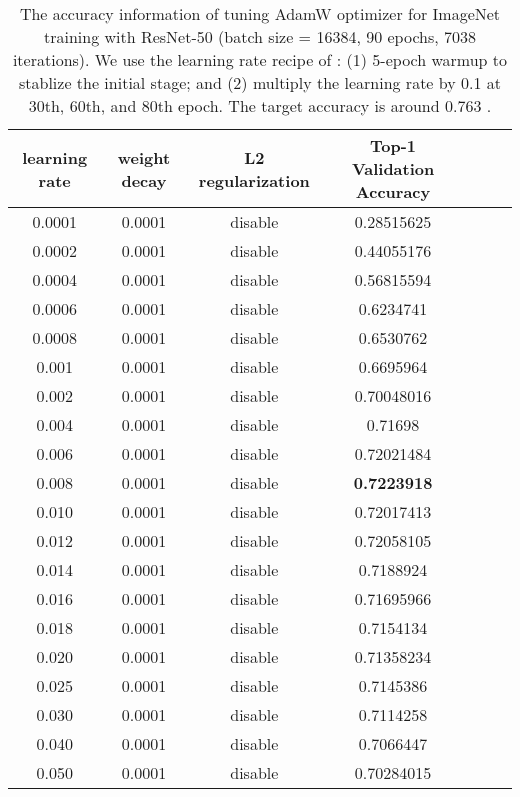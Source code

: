 \documentclass{article} \usepackage{iclr2020_conference,times}
\begin{document}
\begin{table}[ht]
\renewcommand{\arraystretch}{1.3}
\caption{The accuracy information of tuning AdamW optimizer for ImageNet training with ResNet-50 (batch size = 16384, 90 epochs, 7038 iterations). We use the learning rate recipe of \citep{goyal2017accurate}: (1) 5-epoch warmup to stablize the initial stage; and (2) multiply the learning rate by 0.1 at 30th, 60th, and 80th epoch. The target accuracy is around 0.763 \citep{goyal2017accurate}.}
\centering
\begin{tabular}{|c|c|c|c|c|c|c|}
\hline
learning rate & weight decay & L2 regularization & Top-1 Validation Accuracy \\
\hline
\hline
0.0001 & 0.0001 & disable & 0.28515625 \\
\hline
0.0002 & 0.0001 & disable & 0.44055176 \\
\hline
0.0004 & 0.0001 & disable & 0.56815594 \\
\hline
0.0006 & 0.0001 & disable & 0.6234741 \\
\hline
0.0008 & 0.0001 & disable & 0.6530762 \\
\hline
0.001 & 0.0001 & disable & 0.6695964 \\
\hline
0.002 & 0.0001 & disable & 0.70048016 \\
\hline
0.004 & 0.0001 & disable & 0.71698 \\
\hline
0.006 & 0.0001 & disable & 0.72021484 \\
\hline
0.008 & 0.0001 & disable & {\bf 0.7223918} \\
\hline
0.010 & 0.0001 & disable &  0.72017413\\
\hline
0.012 & 0.0001 & disable &  0.72058105\\
\hline
0.014 & 0.0001 & disable &  0.7188924\\
\hline
0.016 & 0.0001 & disable &  0.71695966\\
\hline
0.018 & 0.0001 & disable &  0.7154134\\
\hline
0.020 & 0.0001 & disable &  0.71358234\\
\hline
0.025 & 0.0001 & disable &  0.7145386\\
\hline
0.030 & 0.0001 & disable &  0.7114258\\
\hline
0.040 & 0.0001 & disable &  0.7066447\\
\hline
0.050 & 0.0001 & disable &  0.70284015\\
\hline
\end{tabular}
\label{table:imagenet_adam_tuning_nol2_2}
\end{table}
\end{document}
